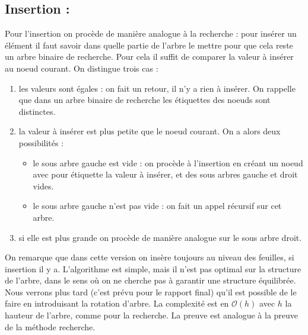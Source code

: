 \documentclass{report}
\begin{document}
\subsection{Insertion :}
Pour l'insertion on procède de manière analogue à la recherche : pour insérer un élément il faut savoir dans quelle partie de l'arbre le mettre pour que cela reste un arbre binaire de recherche.
Pour cela il suffit de comparer la valeur à insérer au noeud courant. On distingue trois cas :
\begin{enumerate}
    \item les valeurs sont égales : on fait un retour, il n'y a rien à insérer. On rappelle que dans un arbre binaire de recherche les étiquettes des noeuds sont distinctes.
    \item la valeur à insérer est plus petite que le noeud courant. On a alors deux possibilités :
    \begin{itemize}
        \item le sous arbre gauche est vide : on procède à l'insertion en créant un noeud avec pour étiquette la valeur à insérer, et des sous arbres gauche et droit vides.
        \item le sous arbre gauche n'est pas vide : on fait un appel récursif sur cet arbre.
    \end{itemize}
    \item si elle est plus grande on procède de manière analogue sur le sous arbre droit.
\end{enumerate}
On remarque que dans cette version on insère toujours au niveau des feuilles, si insertion il y a. L'algorithme est simple, mais il n'est pas optimal sur la structure de l'arbre, dans le sens où on ne cherche pas à garantir une structure équilibrée. Nous verrons plus tard (c'est prévu pour le rapport final) qu'il est possible de le faire en introduisant la rotation d'arbre.
La complexité est en $\mathcal{O}(h)$ avec $h$ la hauteur de l'arbre, comme pour la recherche. La preuve est analogue à la preuve de la méthode recherche.
\end{document}
